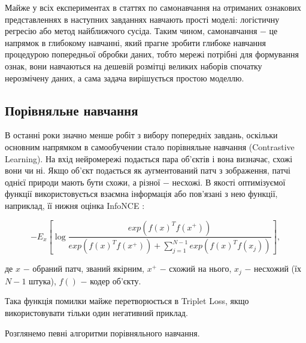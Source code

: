 Майже у всіх експериментах в статтях по самонавчання на отриманих ознакових представленнях в наступних завданнях навчають прості моделі: логістичну регресію або метод найближчого сусіда. Таким чином, самонавчання $-$ це напрямок в глибокому навчанні, який прагне зробити глибоке навчання процедурою попередньої обробки даних, тобто мережі потрібні для формування ознак, вони навчаються на дешевій розмітці великих наборів спочатку нерозмічену даних, а сама задача вирішується простою моделлю.

\vspace{1.5em}

\subsection{Порівняльне навчання}

В останні роки значно менше робіт з вибору попередніх завдань, оскільки основним напрямком в самообучении стало порівняльне навчання (Contrastive Learning). На вхід нейромережі подається пара об'єктів і вона визначає, схожі вони чи ні. Якщо об'єкт подається як аугментований патч з зображення, патчі однієї природи мають бути схожи, а різної $-$ несхожі. В якості оптимізуємої функції використовується взаємна інформація або пов'язані з нею функції, наприклад, її нижня оцінка InfoNCE :

\begin{equation}\label{eq:infonce}
-E_{x}\left[ \log{\frac{exp(f(x)^{T}f(x^{+}))}{exp(f(x)^{T}f(x^{+}))+\sum_{j=1}^{N-1}exp(f(x)^{T}f(x_{j}))}} \right],
\end{equation}

\noindent де $x$ $-$ обраний патч, званий якірним, \newline
\hspace*{15pt} $x^{+}$ $-$ схожий на нього, \newline
\hspace*{15pt} $x_{j}$ $-$ несхожий (їх $N-1$ штука), \newline
\hspace*{15pt} $f()$ $-$ кодер об'єкту. 

\vspace{1.5em}

Така функція помилки майже перетворюється в Triplet Loss, якщо використовувати тільки один негативний приклад.

Розглянемо певні алгоритми порівняльного навчання.

\vspace{1.5em}

